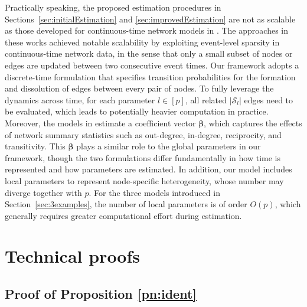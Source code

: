 \documentclass[12pt]{article}
\newcommand{\bbeta}{\boldsymbol \beta}
\newcommand{\0}{{\bf 0}}
\begin{document}
Practically speaking, the proposed estimation procedures in Sections~\ref{sec:initialEstimation} and \ref{sec:improvedEstimation} are not as scalable as those developed for continuous-time network models in \cite{Vu2011a_supp, Vu2011b_supp,Salathe2013_supp}.
The approaches in these works achieved notable scalability by exploiting event-level sparsity in continuous-time network data, in the sense that only a small subset of nodes or edges are updated between two consecutive event times. 
Our framework adopts a discrete-time formulation that specifies transition probabilities for the formation and dissolution of edges between every pair of nodes.
To fully leverage the dynamics across time, for each parameter $l \in [p]$, all related $|\mathcal{S}_l|$ edges need to be evaluated, which leads to potentially heavier computation in practice.
Moreover, the models in \cite{Vu2011a_supp, Vu2011b_supp} estimate a  coefficient vector $\bbeta$, which captures the effects of network summary statistics such as out-degree, in-degree, reciprocity, and transitivity. This $\bbeta$ plays a similar role to the global parameters in our framework, though the two formulations differ fundamentally in how time is represented and how parameters are estimated.  In addition, our model includes local parameters to represent node-specific heterogeneity, whose number may diverge together with $p$. For the three models introduced in Section~\ref{sec:3examples}, the number of local parameters is of order $O(p)$, which generally requires greater computational effort during estimation.

\section{Technical proofs} \label{app:proofs}

\subsection{Proof of Proposition \ref{pn:ident}} \label{pr:pn:ident}
\end{document}
